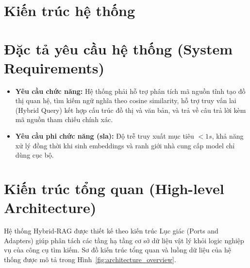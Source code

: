 \documentclass[12pt,a4paper,oneside]{report}
\begin{document}
\section{Kiến trúc hệ thống}

\section{Đặc tả yêu cầu hệ thống (System Requirements)}
\begin{itemize}
    \item \textbf{Yêu cầu chức năng:} Hệ thống phải hỗ trợ phân tích mã nguồn tĩnh tạo đồ thị quan hệ, tìm kiếm ngữ nghĩa theo cosine similarity, hỗ trợ truy vấn lai (Hybrid Query) kết hợp cấu trúc đồ thị và văn bản, và trả về câu trả lời kèm mã nguồn tham chiếu chính xác.
    \item \textbf{Yêu cầu phi chức năng (\gls{sla}):} Độ trễ truy xuất mục tiêu $< 1s$, khả năng xử lý đồng thời khi sinh embeddings và ranh giới nhà cung cấp model chỉ dùng cục bộ.
\end{itemize}

\section{Kiến trúc tổng quan (High-level Architecture)}
Hệ thống Hybrid-RAG được thiết kế theo kiến trúc Lục giác (Ports and Adapters) \cite{cockburn2005hexagonal} giúp phân tách các tầng hạ tầng cơ sở dữ liệu vật lý khỏi logic nghiệp vụ của công cụ tìm kiếm. Sơ đồ kiến trúc tổng quan và luồng dữ liệu của hệ thống được mô tả trong Hình~\ref{fig:architecture_overview}.
\end{document}
